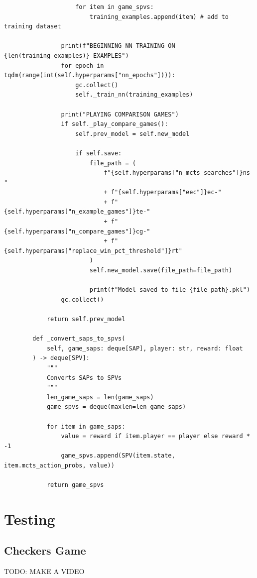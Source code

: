 \documentclass{article}
\begin{document}
\begin{verbatim}
                    for item in game_spvs:
                        training_examples.append(item) # add to training dataset

                print(f"BEGINNING NN TRAINING ON {len(training_examples)} EXAMPLES")
                for epoch in tqdm(range(int(self.hyperparams["nn_epochs"]))):
                    gc.collect()
                    self._train_nn(training_examples)

                print("PLAYING COMPARISON GAMES")
                if self._play_compare_games():
                    self.prev_model = self.new_model

                    if self.save:
                        file_path = (
                            f"{self.hyperparams["n_mcts_searches"]}ns-"
                            + f"{self.hyperparams["eec"]}ec-"
                            + f"{self.hyperparams["n_example_games"]}te-"
                            + f"{self.hyperparams["n_compare_games"]}cg-"
                            + f"{self.hyperparams["replace_win_pct_threshold"]}rt"
                        )
                        self.new_model.save(file_path=file_path)

                        print(f"Model saved to file {file_path}.pkl")
                gc.collect()

            return self.prev_model

        def _convert_saps_to_spvs(
            self, game_saps: deque[SAP], player: str, reward: float
        ) -> deque[SPV]:
            """
            Converts SAPs to SPVs
            """
            len_game_saps = len(game_saps)
            game_spvs = deque(maxlen=len_game_saps)

            for item in game_saps:
                value = reward if item.player == player else reward * -1
                game_spvs.append(SPV(item.state, item.mcts_action_probs, value))

            return game_spvs
    \end{verbatim}

    \section{Testing}
    \secttoc

    \subsection{Checkers Game}

    TODO: MAKE A VIDEO
\end{document}
